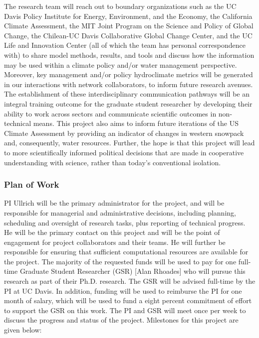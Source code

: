 \documentclass[11pt]{article}
\begin{document}
The research team will reach out to boundary organizations such as the UC Davis Policy Institute for Energy, Environment, and the Economy, the California Climate Assessment, the MIT Joint Program on the Science and Policy of Global Change, the Chilean-UC Davis Collaborative Global Change Center, and the UC Life and Innovation Center (all of which the team has personal correspondence with) to share model methods, results, and tools and discuss how the information may be used within a climate policy and/or water management perspective.  Moreover, key management and/or policy hydroclimate metrics will be generated in our interactions with network collaborators, to inform future research avenues.  The establishment of these interdisciplinary communication pathways will be an integral training outcome for the graduate student researcher by developing their ability to work across sectors and communicate scientific outcomes in non-technical means.  This project also aims to inform future iterations of the US Climate Assessment by providing an indicator of changes in western snowpack and, consequently, water resources.  Further, the hope is that this project will lead to more scientifically informed political decisions that are made in cooperative understanding with science, rather than today's conventional isolation.


\subsubsection{Plan of Work}

PI Ullrich will be the primary administrator for the project, and will be responsible for managerial and administrative decisions, including planning, scheduling and oversight of research tasks, plus reporting of technical progress. He will be the primary contact on this project and will be the point of engagement for project collaborators and their teams. He will further be responsible for ensuring that sufficient computational resources are available for the project. The majority of the requested funds will be used to pay for one full-time Graduate Student Researcher (GSR) [Alan Rhoades] who will pursue this research as part of their Ph.D. research. The GSR will be advised full-time by the PI at UC Davis. In addition, funding will be used to reimburse the PI for one month of salary, which will be used to fund a eight percent commitment of effort to support the GSR on this work. The PI and GSR will meet once per week to discuss the progress and status of the project. Milestones for this project are given below:
\end{document}
